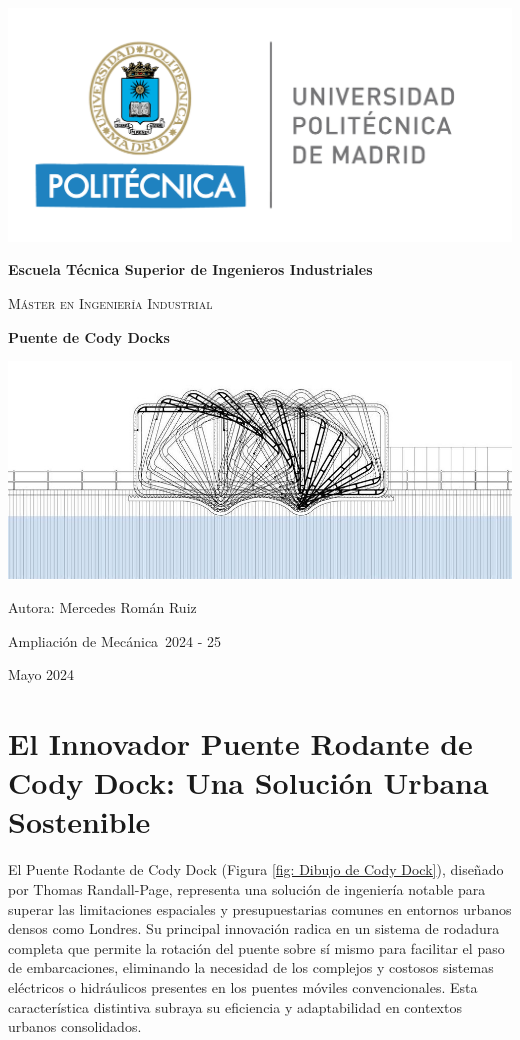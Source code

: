 \documentclass{IEEEtran}
\def\TituloProyecto{Puente de Cody Docks}
\def\Asignatura{Ampliación de Mecánica}
\def\Curso{2024 - 25}
\def\Fecha{Mayo 2024}
\begin{document}
\sloppy 
\setlength{\parindent}{30pt}
\setlength{\parskip}{6pt}
\renewcommand\thesection{\arabic{section}}
\renewcommand{\baselinestretch}{1.5}

\begin{titlepage}
    \centering
    \includegraphics[width=0.5\linewidth]{Imagenes/Logo UPM.png} \par
    \vspace{1cm}
    {\bfseries\LARGE Escuela Técnica Superior de Ingenieros Industriales \par}
    \vspace{0.5cm}
    {\scshape\Large Máster en Ingeniería Industrial \par}
    \vspace{3 cm}
    {\Huge \textbf{\TituloProyecto} \par}
    \vfill
    \includegraphics[width=0.5\linewidth]{Imagenes/Puente de Cody Docks.jpg} \par
    \vfill
    {\Large Autora: Mercedes Román Ruiz \par}
    {\Large \Asignatura \  \Curso \par}
    {\Large \Fecha \par}
\end{titlepage}

\tableofcontents

\section{El Innovador Puente Rodante de Cody Dock: Una Solución Urbana Sostenible}

El Puente Rodante de Cody Dock (Figura \ref{fig: Dibujo de Cody Dock}), diseñado por Thomas Randall-Page, representa una solución de ingeniería notable para superar las limitaciones espaciales y presupuestarias comunes en entornos urbanos densos como Londres. Su principal innovación radica en un sistema de rodadura completa que permite la rotación del puente sobre sí mismo para facilitar el paso de embarcaciones, eliminando la necesidad de los complejos y costosos sistemas eléctricos o hidráulicos presentes en los puentes móviles convencionales. Esta característica distintiva subraya su eficiencia y adaptabilidad en contextos urbanos consolidados.
\end{document}
